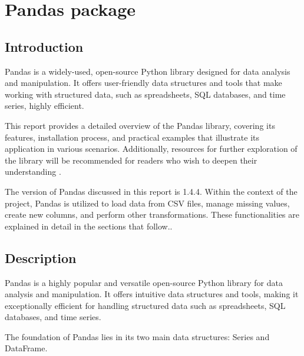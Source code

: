 %
%

\chapter{Pandas package}

\section{Introduction}

Pandas is a widely-used, open-source Python library designed for data analysis and manipulation. It offers user-friendly data structures and tools that make working with structured data, such as spreadsheets, SQL databases, and time series, highly efficient.

This report provides a detailed overview of the Pandas library, covering its features, installation process, and practical examples that illustrate its application in various scenarios. Additionally, resources for further exploration of the library will be recommended for readers who wish to deepen their understanding \cite{McKinney:2011}. 

The version of Pandas discussed in this report is 1.4.4. Within the context of the project, Pandas is utilized to load data from CSV files, manage missing values, create new columns, and perform other transformations. These functionalities are explained in detail in the sections that follow.\cite{McKinney:2015}.

\section{Description}

Pandas is a highly popular and versatile open-source Python library for data analysis and manipulation. It offers intuitive data structures and tools, making it exceptionally efficient for handling structured data such as spreadsheets, SQL databases, and time series.

The foundation of Pandas lies in its two main data structures: Series and DataFrame.

